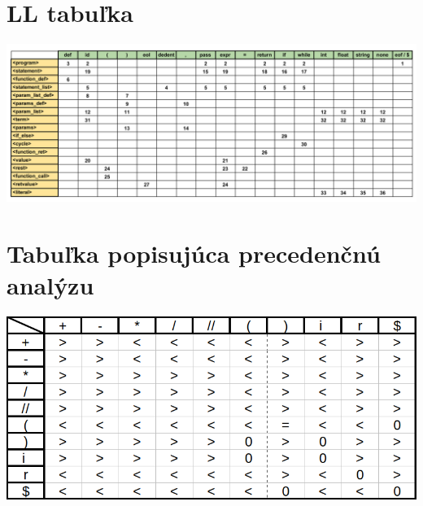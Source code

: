 \documentclass{article}
\begin{document}
	\section{LL tabuľka }
	\center\includegraphics[width=1\linewidth]{./LLtable.png}
	\section{Tabuľka popisujúca precedenčnú analýzu }
	\center\includegraphics[width=1\linewidth]{./precedence_table.png}
	
\end{document}
